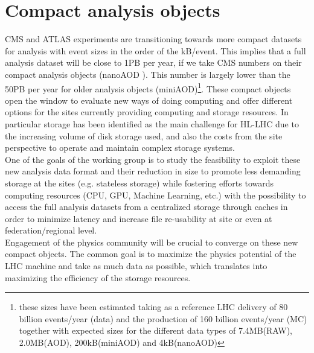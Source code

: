 \section{Compact analysis objects}
CMS and ATLAS experiments are transitioning towards more compact datasets for analysis with event sizes in the order of the kB/event. This implies that a full analysis dataset will be close to 1PB per year, if we take CMS numbers on their compact analysis objects (nanoAOD \cite{nano}). This number is largely lower than the 50PB per year for older analysis objects (miniAOD)\footnote{ these sizes have been estimated taking as a reference LHC delivery of 80 billion events/year (data) and the production of 160 billion events/year (MC) together with expected sizes for the different data types of 7.4MB(RAW), 2.0MB(AOD), 200kB(miniAOD) and 4kB(nanoAOD)}. These compact objects open the window to evaluate new ways of doing computing and offer different options for the sites currently providing computing and storage resources. In particular storage has been identified as the main challenge for HL-LHC due to the increasing volume of disk storage used, and also the costs from the site perspective to operate and maintain complex storage systems.\\
One of the goals of the working group is to study the feasibility to exploit these new analysis data format and their reduction in size to promote less demanding storage at the sites (e.g. stateless storage) while fostering efforts towards computing resources (CPU, GPU, Machine Learning, etc.) with the possibility to access the full analysis datasets from a centralized storage through caches in order to minimize latency and increase file re-usability at site or even at federation/regional level.\\
Engagement of the physics community will be crucial to converge on these new compact objects. The common goal is to maximize the physics potential of the LHC machine and take as much data as possible, which translates into maximizing the efficiency of the storage resources.\\
